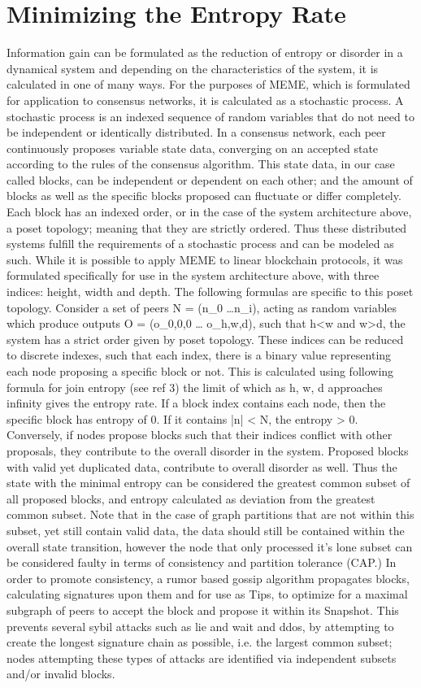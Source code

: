 \documentclass{article}
\begin{document}
\section{Minimizing the Entropy Rate}
Information gain can be formulated as the reduction of entropy or disorder in a dynamical system and depending on the characteristics of the system, it is calculated in one of many ways. For the purposes of MEME, which is formulated for application to consensus networks, it is calculated as a stochastic process.
	A stochastic process is an indexed sequence of random variables that do not need to be independent or identically distributed. In a consensus network, each peer continuously proposes variable state data, converging on an accepted state according to the rules of the consensus algorithm. This state data, in our case called blocks, can be independent or dependent on each other; and the amount of blocks as well as the specific blocks proposed can fluctuate or differ completely. Each block has an indexed order, or in the case of the system architecture above, a poset topology; meaning that they are strictly ordered. Thus these distributed systems fulfill the requirements of a stochastic process and can be modeled as such. While it is possible to apply MEME to linear blockchain protocols, it was formulated specifically for use in the system architecture above, with three indices: height, width and depth. The following formulas are specific to this poset topology.
	Consider a set of peers N = (n_0 …n_i), acting as random variables which produce outputs O = (o_{0,0,0} … o_{h,w,d}), such that h<w and w>d, the system has a strict order given by poset topology. These indices can be reduced to discrete indexes, such that each index, there is a binary value representing each node proposing a specific block or not. This is calculated using following formula for join entropy (see ref 3) the limit of which as h, w, d approaches infinity gives the entropy rate.
If a block index contains each node, then the specific block has entropy of 0. If it contains |n| < N, the entropy > 0. Conversely, if nodes propose blocks such that their indices conflict with other proposals, they contribute to the overall disorder in the system. Proposed blocks with valid yet duplicated data, contribute to overall disorder as well. Thus the state with the minimal entropy can be considered the greatest common subset of all proposed blocks, and entropy calculated as deviation from the greatest common subset. Note that in the case of graph partitions that are not within this subset, yet still contain valid data, the data should still be contained within the overall state transition, however the node that only processed it’s lone subset can be considered faulty in terms of consistency and partition tolerance (CAP.) In order to promote consistency, a rumor based gossip algorithm propagates blocks, calculating signatures upon them and for use as Tips, to optimize for a maximal subgraph of peers to accept the block and propose it within its Snapshot. This prevents several sybil attacks such as lie and wait and ddos, by attempting to create the longest signature chain as possible, i.e. the largest common subset; nodes attempting these types of attacks are identified via independent subsets and/or invalid blocks.
\end{document}
